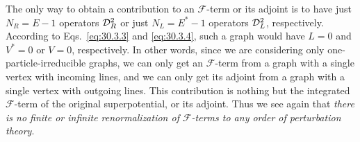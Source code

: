 The only way to obtain a contribution to an \(\mathcal{F}\)-term or its
adjoint is to have just \(N_R=E-1\) operators \(\mathcal{D}_R^2\) or just
\(N_L=E^*-1\) operators \(\mathcal{D}_L^2\), respectively. According to
Eqs.~\eqref{eq:30.3.3} and \eqref{eq:30.3.4}, such a graph would have \(L=0\)
and \(V^*=0\) or \(V=0\), respectively. In other words, since we are
considering only one-particle-irreducible graphs, we can only get an
\(\mathcal{F}\)-term from a graph with a single vertex with incoming lines,
and we can only get its adjoint from a graph with a single vertex with
outgoing lines. This contribution is nothing but the integrated
\(\mathcal{F}\)-term of the original superpotential, or its adjoint. Thus we
see again that \emph{there is no finite or infinite renormalization of
\(\mathcal{F}\)-terms to any order of perturbation theory}.
